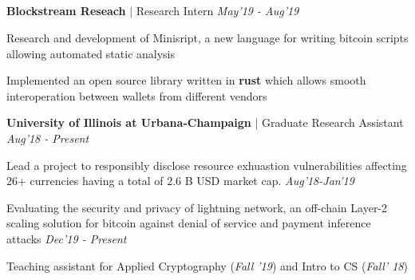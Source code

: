 \documentclass[margin,line]{resume}
\begin{document}
\begin{resume}
\vspace{-5mm}
\section{}

\textbf{Blockstream Reseach} $\mid$ Research Intern 
\hfill \textit{May'19 - Aug'19}\\
\vspace{-3.5mm}
\begin{list2}
\item Research and development of Minisript, a new language for writing bitcoin scripts allowing automated static analysis
\item Implemented an open source library written in \textbf{rust} which allows smooth interoperation between wallets from different vendors
\end{list2}
\vspace{-3.5mm}
\textbf{University of Illinois at Urbana-Champaign} $\mid$ Graduate Research Assistant 
\hfill \textit{Aug'18 - Present}\\
\vspace{-3.5mm}
\begin{list2}
\item  Lead a project to responsibly disclose resource exhuastion vulnerabilities affecting 26+ currencies having a total of 2.6 B USD market cap. \hfill \textit{Aug'18-Jan'19}
\item Evaluating the security and privacy of lightning network, an off-chain Layer-2 scaling solution for bitcoin against denial of service and payment inference attacks \hfill \textit{Dec'19 - Present}
\item Teaching assistant for Applied Cryptography (\textit{Fall '19}) and Intro to CS (\textit{Fall' 18}) \hfill 
\end{list2}

\vspace{-2mm}


\end{resume}
\end{document}
